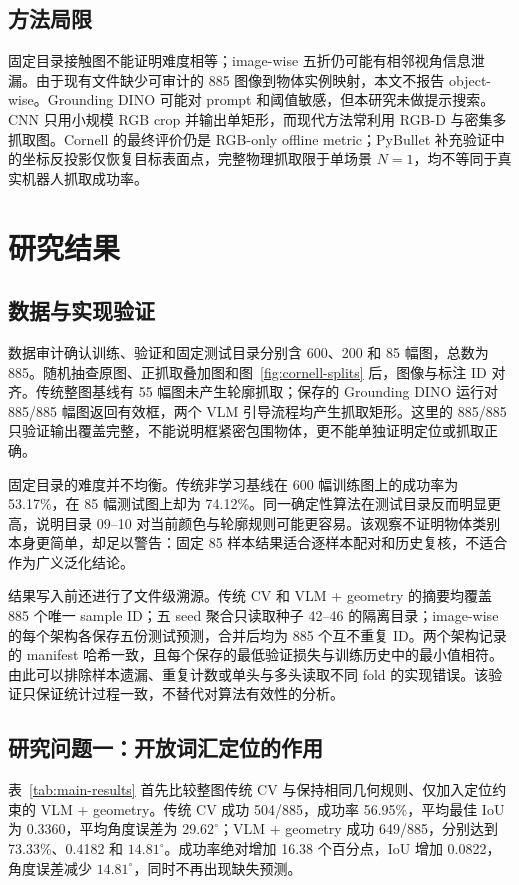 \documentclass{l4proj}
\begin{document}
\section{方法局限}
固定目录接触图不能证明难度相等；image-wise 五折仍可能有相邻视角信息泄漏。由于现有文件缺少可审计的 885 图像到物体实例映射，本文不报告 object-wise。Grounding DINO 可能对 prompt 和阈值敏感，但本研究未做提示搜索。CNN 只用小规模 RGB crop 并输出单矩形，而现代方法常利用 RGB-D 与密集多抓取图。Cornell 的最终评价仍是 RGB-only offline metric；PyBullet 补充验证中的坐标反投影仅恢复目标表面点，完整物理抓取限于单场景 $N=1$，均不等同于真实机器人抓取成功率。

\chapter{研究结果}

\section{数据与实现验证}
数据审计确认训练、验证和固定测试目录分别含 600、200 和 85 幅图，总数为 885。随机抽查原图、正抓取叠加图和图~\ref{fig:cornell-splits} 后，图像与标注 ID 对齐。传统整图基线有 55 幅图未产生轮廓抓取；保存的 Grounding DINO 运行对 885/885 幅图返回有效框，两个 VLM 引导流程均产生抓取矩形。这里的 885/885 只验证输出覆盖完整，不能说明框紧密包围物体，更不能单独证明定位或抓取正确。

固定目录的难度并不均衡。传统非学习基线在 600 幅训练图上的成功率为 53.17\%，在 85 幅测试图上却为 74.12\%。同一确定性算法在测试目录反而明显更高，说明目录 09--10 对当前颜色与轮廓规则可能更容易。该观察不证明物体类别本身更简单，却足以警告：固定 85 样本结果适合逐样本配对和历史复核，不适合作为广义泛化结论。

结果写入前还进行了文件级溯源。传统 CV 和 VLM + geometry 的摘要均覆盖 885 个唯一 sample ID；五 seed 聚合只读取种子 42--46 的隔离目录；image-wise 的每个架构各保存五份测试预测，合并后均为 885 个互不重复 ID。两个架构记录的 manifest 哈希一致，且每个保存的最低验证损失与训练历史中的最小值相符。由此可以排除样本遗漏、重复计数或单头与多头读取不同 fold 的实现错误。该验证只保证统计过程一致，不替代对算法有效性的分析。

\section{研究问题一：开放词汇定位的作用}
表~\ref{tab:main-results} 首先比较整图传统 CV 与保持相同几何规则、仅加入定位约束的 VLM + geometry。传统 CV 成功 504/885，成功率 56.95\%，平均最佳 IoU 为 0.3360，平均角度误差为 $29.62^\circ$；VLM + geometry 成功 649/885，分别达到 73.33\%、0.4182 和 $14.81^\circ$。成功率绝对增加 16.38 个百分点，IoU 增加 0.0822，角度误差减少 $14.81^\circ$，同时不再出现缺失预测。
\end{document}

